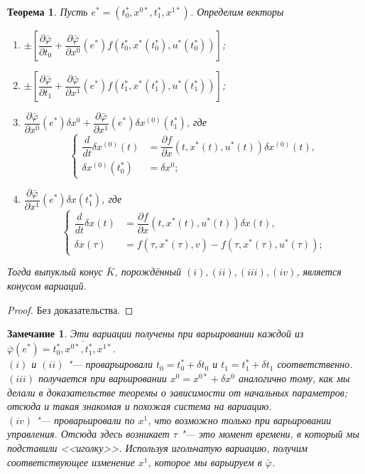 \documentclass[12pt, a4paper]{article}
\theoremstyle{rusdef}
\newtheorem{theorem}{Теорема}
\newtheorem{remark}{Замечание}
\renewcommand{\d}{\partial} %
\begin{document}
\begin{theorem}
  Пусть $e^* = (t_0^*, x^{0*}, t_1^*, x^{1*})$. Определим векторы
  \begin{enumerate}
    \item[(i)] $\pm \left[ \dfrac{\d \bar{\varphi}}{\d t_0} + \dfrac{\d \bar{\varphi}}{\d x^0}(e^*) f(t_0^*, x^*(t_0^*), u^*(t_0^*)) \right]$;
    \item[(ii)] $\pm \left[ \dfrac{\d \bar{\varphi}}{\d t_1} + \dfrac{\d \bar{\varphi}}{\d x^1}(e^*) f(t_1^*, x^*(t_1^*), u^*(t_1^*)) \right]$;
    \item[(iii)] $\dfrac{\d \bar{\varphi}}{\d x^0}(e^*) \delta x^0 + \dfrac{\d \bar{\varphi}}{\d x^1}(e^*) \delta x^{(0)} (t_1^*)$, где 
    \[
      \left\{
        \begin{aligned}
          \dfrac{d}{dt}\delta x^{(0)}(t) &= \dfrac{\d f}{\d x}(t, x^*(t), u^*(t)) \delta x^{(0)}(t), \\
          \delta x^{(0)} (t^*_0) &= \delta x^0;
        \end{aligned}
      \right.
    \]
    \item[(iv)] $\dfrac{\d \bar{\varphi}}{\d x^1}(e^*) \delta x(t_1^*)$, где
    \[
      \left\{
        \begin{aligned}
          \dfrac{d}{dt}\delta x(t) &= \dfrac{\d f}{\d x}(t, x^*(t), u^*(t)) \delta x(t), \\
          \delta x (\tau) &= f(\tau, x^*(\tau), v) - f(\tau, x^*(\tau), u^*(\tau));
        \end{aligned}
      \right.
    \] 
  \end{enumerate}

  Тогда выпуклый конус $\bar{K}$, порождённый $(i), (ii), (iii), (iv)$, является конусом вариаций.
\end{theorem}
\begin{proof}
  Без доказательства.
\end{proof}

\begin{remark}
  Эти вариации получены при варьировании каждой из $\bar{\varphi}(e^*) = \bar{t_0^*, x^{0*}, t_1^*, x^{1*}}$. \\
  $(i)$ и $(ii)$ "--- проварьировали $t_0 = t_0^* + \delta t_0$ и $t_1 = t_1^* + \delta t_1$ соответственно. \\
  $(iii)$ получается при варьировании $x^0 = x^{0*} + \delta x^0$ аналогично тому, как мы делали в доказательстве теоремы о зависимости от начальных параметров; отсюда и такая знакомая и похожая система на вариацию. \\
  $(iv)$ "--- проварьировали по $x^1$, что возможно только при варьировании управления. Отсюда здесь возникает $\tau$ "--- это момент времени, в который мы подставили <<иголку>>. Используя игольчатую вариацию, получим соответствующее изменение $x^1$, которое мы варьируем в $\bar{\varphi}$.
\end{remark}
\end{document}
